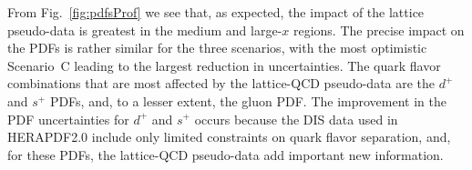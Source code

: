 From Fig.~\ref{fig:pdfsProf} we see that, as expected, the impact of the 
lattice pseudo-data is greatest in the medium and large-$x$ regions.
%
The precise impact on the PDFs is rather
similar for the three scenarios, with the most optimistic
Scenario~C leading to the largest reduction in uncertainties.
%
The quark flavor combinations that are most affected by the
lattice-QCD pseudo-data are the $d^{+}$ and $s^{+}$ PDFs,
and, to a lesser extent, the gluon PDF.
%
The improvement in the PDF uncertainties for $d^{+}$ and $s^{+}$
occurs because the DIS data
used in HERAPDF2.0 include only limited constraints
on quark flavor separation, and, for these PDFs, the lattice-QCD 
pseudo-data add important new information.

